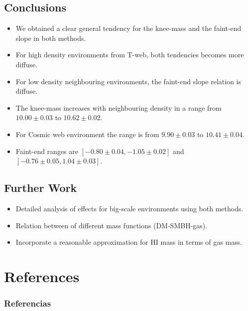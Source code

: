 \documentclass[xcolor=dvipsnames]{beamer}
\begin{document}
\subsection{Conclusions}
\begin{frame}
\begin{itemize}
			\item We obtained a clear general tendency for the knee-mass and the faint-end slope in both methods.
			\item For high density environments from T-web, both tendencies becomes more diffuse.
			\item For low density neighbouring environments, the faint-end slope relation is diffuse. 
\end{itemize}
\end{frame}
\begin{frame}
\begin{itemize}
			\item The knee-mass increases with neighbouring density in a range from $10.00\pm0.03$ to $10.62\pm0.02$.
			\item For Cosmic web environment the range is from $9.90\pm0.03$ to $10.41\pm0.04$.
			\item Faint-end ranges are $[-0.80\pm0.04,-1.05\pm0.02]$ and $[-0.76\pm0.05,1.04\pm0.03]$.
\end{itemize}
\end{frame}
\subsection{Further Work}
\begin{frame}
\begin{itemize}
			\item Detailed analysis of effects for big-scale environments using both methods.
			\item Relation between of different mass functions (DM-SMBH-gas).
			\item Incorporate a reasonable approximation for HI mass in terms of gas mass.
\end{itemize}
\end{frame}


\section{References}
\begin{frame}[t, allowframebreaks]
\frametitle{Referencias}
\tiny


\end{frame}
\end{document}
